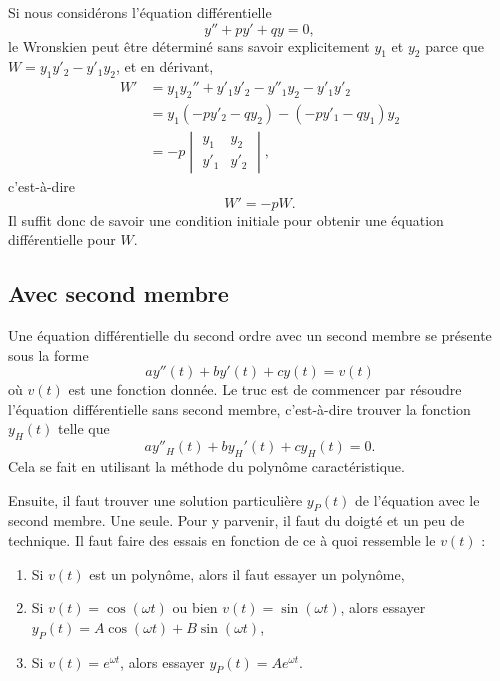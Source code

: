Si nous considérons l'équation différentielle
\begin{equation}
	y''+py'+qy=0,
\end{equation}
le Wronskien peut être déterminé sans savoir explicitement \( y_1\) et \( y_2\) parce que \( W=y_1y'_2-y'_1y_2\), et en dérivant,
\begin{subequations}
	\begin{align}
		W' & =y_1y_2''+y'_1y'_2-y''_1y_2-y'_1y'_2 \\
		   & =y_1(-py'_2-qy_2)-(-py'_1-qy_1)y_2   \\
		   & =-p\begin{vmatrix}
			        y_1  & y_2  \\
			        y'_1 & y'_2
		        \end{vmatrix},
	\end{align}
\end{subequations}
c'est-à-dire
\begin{equation}    \label{EqHEMRgM}
	W'=-pW.
\end{equation}
Il suffit donc de savoir une condition initiale pour obtenir une équation différentielle pour \( W\).

\subsection{Avec second membre}

Une équation différentielle du second ordre avec un second membre se présente sous la forme
\begin{equation}
	ay''(t)+by'(t)+cy(t)=v(t)
\end{equation}
où \( v(t)\) est une fonction donnée. Le truc est de commencer par résoudre l'équation différentielle sans second membre, c'est-à-dire trouver la fonction \( y_H(t)\) telle que
\begin{equation}
	ay''_H(t)+by_H'(t)+cy_H(t)=0.
\end{equation}
Cela se fait en utilisant la méthode du polynôme caractéristique.

Ensuite, il faut trouver une solution particulière \( y_P(t)\) de l'équation avec le second membre. Une seule. Pour y parvenir, il faut du doigté et un peu de technique. Il faut faire des essais en fonction de ce à quoi ressemble le \( v(t)\) :
\begin{enumerate}

	\item
	      Si \( v(t)\) est un polynôme, alors il faut essayer un polynôme,

	\item
	      Si \( v(t)=\cos(\omega t)\) ou bien \( v(t)=\sin(\omega t)\), alors essayer \( y_P(t)=A\cos(\omega t)+B\sin(\omega t)\),

	\item
	      Si \( v(t)= e^{\omega t}\), alors essayer \( y_P(t)=A e^{\omega t}\).

\end{enumerate}

